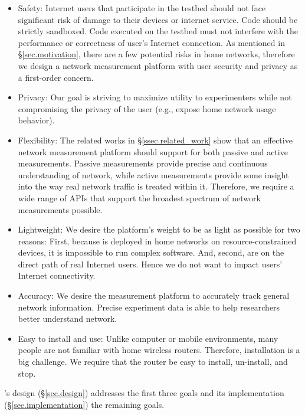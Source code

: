 \begin{itemize}
\item Safety: Internet users that participate in the testbed should not face significant risk of damage to their devices or internet service. Code should be strictly sandboxed. Code executed on the testbed must not interfere with the performance or correctness of user's Internet connection. As mentioned in \S{\ref{sec.motivation}}, there are a few potential risks in home networks, therefore we design a network measurement platform with user security and privacy as a first-order concern.

\item Privacy: Our goal is striving to maximize utility to experimenters while not compromising the privacy of the user (e.g., expose home network usage behavior).

\item Flexibility: The related works in \S{\ref{ssec.related_work}} show that an effective network measurement platform should support for both passive and active measurements. Passive measurements provide precise and continuous understanding of network, while active measurements provide some insight into the way real network traffic is treated within it. Therefore, we require a wide range of APIs that support the broadest spectrum of network measurements possible.

\item Lightweight: We desire the platform's weight to be as light as possible for two reasons: First, because \sysname is deployed in home networks on resource-constrained devices, it is impossible to run complex software. And, second,  \sysname are on the direct path of real Internet users. Hence we do not want to impact users' Internet connectivity.

\item Accuracy: We desire the measurement platform to accurately track 
general network information. Precise experiment data is able to help researchers better understand network.

\item Easy to install and use: Unlike computer or mobile environments, many people are not familiar with home wireless routers. Therefore, installation is a big challenge. We require that the router be easy to install, un-install, and stop.
\end{itemize}

\sysname's design (\S\ref{sec.design}) addresses the first three goals and its implementation (\S\ref{sec.implementation}) the remaining goals.